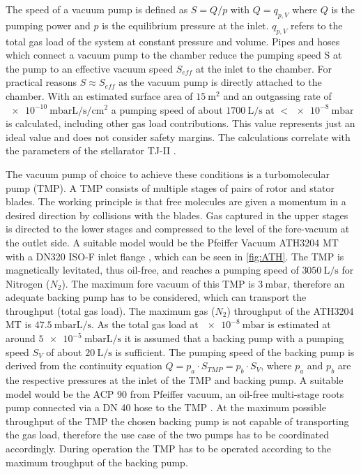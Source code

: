 The speed of a vacuum pump is defined as $S=Q/p$ with $Q=q_{p,V}$ where $Q$ is the pumping power and $p$ is the equilibrium pressure at the inlet. $q_{p,V}$ refers to the total gas load of the system at constant pressure and volume.
Pipes and hoses which connect a vacuum pump to the chamber reduce the pumping speed S at the pump to an effective vacuum speed $S_{eff}$ at the inlet to the chamber.
For practical reasons $S\approx S_{eff}$ as the vacuum pump is directly attached to the chamber.
With an estimated surface area of $\SI{15}{\square\meter}$ and an outgassing rate of $\SI{e-10}{\milli\bar\liter\per\second\per\square\cm}$ a pumping speed of about $\SI{1700}{\liter\per\second}$ at $<\SI{e-8}{\milli\bar}$ is calculated, including other gas load contributions.
This value represents just an ideal value and does not consider safety margins.
The calculations correlate with the parameters of the stellarator TJ-II \cite{vacsystj2}.

The vacuum pump of choice to achieve these conditions is a turbomolecular pump (TMP).
A TMP consists of multiple stages of pairs of rotor and stator blades.
The working principle is that free molecules are given a momentum in a desired direction by collisions with the blades.
Gas captured in the upper stages is directed to the lower stages and compressed to the level of the fore-vacuum at the outlet side.
A suitable model would be the Pfeiffer Vacuum ATH3204 MT with a DN320 ISO-F inlet flange \cite{ATH3204}, which can be seen in \ref{fig:ATH}.
The TMP is magnetically levitated, thus oil-free, and reaches a pumping speed of $\SI{3050}{\liter\per\second}$ for Nitrogen ($N_{2}$).
The maximum fore vacuum of this TMP is $\SI{3}{\milli\bar}$, therefore an adequate backing pump has to be considered, which can transport the throughput (total gas load).
The maximum gas ($N_{2}$) throughput of the ATH3204 MT is $\SI{47.5}{\milli\bar\liter\per\second}$.
As the total gas load at $\SI{e-8}{\milli\bar}$ is estimated at around $\SI{5e-5}{\milli\bar\liter\per\second}$ it is assumed that a backing pump with a pumping speed $S_{V}$ of about $\SI{20}{\liter\per\second}$ is sufficient.
The pumping speed of the backing pump is derived from the continuity equation $Q = p_{a}\cdot S_{TMP} = p_{b}\cdot S_{V}$, where $p_{a}$ and $p_{b}$ are the respective pressures at the inlet of the TMP and backing pump.
A suitable model would be the ACP 90 from Pfeiffer vacuum, an oil-free multi-stage roots pump connected via a DN 40 hose to the TMP \cite{ACP90}.
At the maximum possible throughput of the TMP the chosen backing pump is not capable of transporting the gas load, therefore the use case of the two pumps has to be coordinated accordingly.
During operation the TMP has to be operated according to the maximum troughput of the backing pump.

